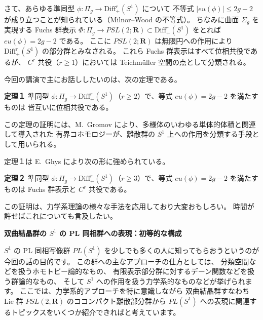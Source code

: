 \documentclass[uplatex,dvipdfmx]{jlreq}
\newcommand{\Diff}{\mathrm{Diff}^r_+(S^1)}
\newcommand{\R}{\mathbf{R}}
\begin{document}
さて、あらゆる準同型 $\phi : \Pi_g \to \Diff$ について
不等式 $|eu(\phi)| \leq 2g - 2$ が成り立つことが知られている（Milnor--Wood の不等式）。
ちなみに曲面 $\Sigma_g$ を実現する Fuchs 群表示
$\Phi : \Pi_g \to PSL(2;\R) \subset \Diff$ をとれば $eu(\phi) = 2g - 2$ である。
ここに $PSL(2;\R)$ は無限円への作用により $\Diff$ の部分群とみなされる。
これら Fuchs 群表示はすべて位相共役であるが、
$C^r$ 共役（$r \geq 1$）においては Teichmüller 空間の点として分類される。

今回の講演で主にお話ししたいのは、次の定理である。

\medskip
\noindent
\textbf{定理１}\quad
準同型 $\phi : \Pi_g \to \Diff$（$r \geq 2$）で、等式 $eu(\phi) = 2g - 2$ を満たすものは
皆互いに位相共役である。

\medskip

この定理の証明には、M.~Gromov により、多様体のいわゆる単体的体積と関連して導入された
有界コホモロジーが、離散群の $S^1$ 上への作用を分類する手段として用いられる。

定理１は E.~Ghys により次の形に強められている。

\medskip
\noindent
\textbf{定理２}\quad
準同型 $\phi : \Pi_g \to \Diff$（$r \geq 3$）で、等式 $eu(\phi) = 2g - 2$ を満たすものは
Fuchs 群表示と $C^r$ 共役である。

\medskip

この証明は、力学系理論の様々な手法を応用しており大変おもしろい。
時間が許せばこれについても言及したい。

\newpage

\begin{center}
{\large\bfseries 双曲結晶群の $S^1$ の PL 同相群への表現：初等的な構成}

\hspace*{\fill}{\large\bfseries 皆川宏之（北大理）}
\end{center}

\medskip

$S^1$ の PL 同相写像群 $PL(S^1)$ を少しでも多くの人に知ってもらおうというのが今回の話の目的です。
この群への主なアプローチの仕方としては、
分類空間などを扱うホモトピー論的なもの、
有限表示部分群に対するデーン関数などを扱う群論的なもの、
そして $S^1$ への作用を扱う力学系的なものなどが挙げられます。
ここでは、力学系的アプローチを特に意識しながら
双曲結晶群すなわち Lie 群 $PSL(2,\mathbf{R})$ のココンパクト離散部分群から
$PL(S^1)$ への表現に関連するトピックスをいくつか紹介できればと考えています。
\end{document}
